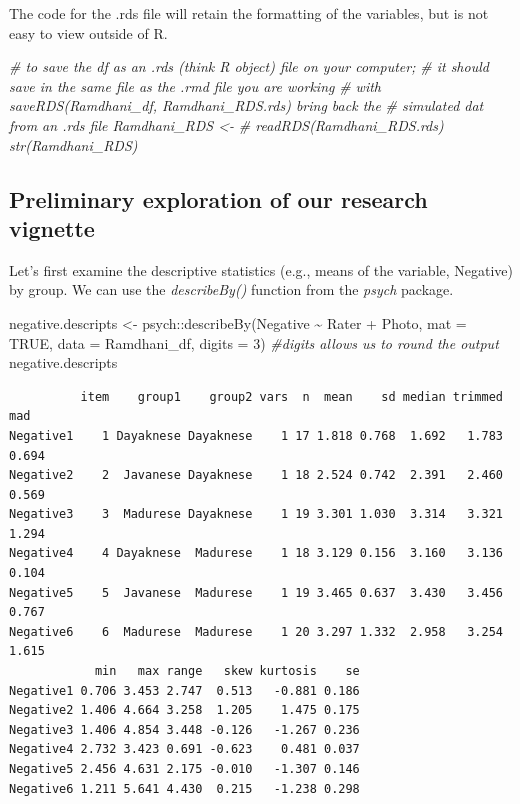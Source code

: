\documentclass[
  11pt,
]{book}
\newenvironment{Shaded}{\begin{snugshade}}{\end{snugshade}}
\newcommand{\AttributeTok}[1]{\textcolor[rgb]{0.77,0.63,0.00}{#1}}
\newcommand{\CommentTok}[1]{\textcolor[rgb]{0.56,0.35,0.01}{\textit{#1}}}
\newcommand{\ConstantTok}[1]{\textcolor[rgb]{0.00,0.00,0.00}{#1}}
\newcommand{\DecValTok}[1]{\textcolor[rgb]{0.00,0.00,0.81}{#1}}
\newcommand{\FunctionTok}[1]{\textcolor[rgb]{0.00,0.00,0.00}{#1}}
\newcommand{\NormalTok}[1]{#1}
\newcommand{\OtherTok}[1]{\textcolor[rgb]{0.56,0.35,0.01}{#1}}
\newcommand{\SpecialCharTok}[1]{\textcolor[rgb]{0.00,0.00,0.00}{#1}}
\begin{document}
The code for the .rds file will retain the formatting of the variables, but is not easy to view outside of R.

\begin{Shaded}
\begin{Highlighting}[]
\CommentTok{\# to save the df as an .rds (think \textquotesingle{}R object\textquotesingle{}) file on your computer;}
\CommentTok{\# it should save in the same file as the .rmd file you are working}
\CommentTok{\# with saveRDS(Ramdhani\_df, \textquotesingle{}Ramdhani\_RDS.rds\textquotesingle{}) bring back the}
\CommentTok{\# simulated dat from an .rds file Ramdhani\_RDS \textless{}{-}}
\CommentTok{\# readRDS(\textquotesingle{}Ramdhani\_RDS.rds\textquotesingle{}) str(Ramdhani\_RDS)}
\end{Highlighting}
\end{Shaded}

\hypertarget{preliminary-exploration-of-our-research-vignette}{%
\subsection{Preliminary exploration of our research vignette}\label{preliminary-exploration-of-our-research-vignette}}

Let's first examine the descriptive statistics (e.g., means of the variable, Negative) by group. We can use the \emph{describeBy()} function from the \emph{psych} package.

\begin{Shaded}
\begin{Highlighting}[]
\NormalTok{negative.descripts }\OtherTok{\textless{}{-}}\NormalTok{ psych}\SpecialCharTok{::}\FunctionTok{describeBy}\NormalTok{(Negative }\SpecialCharTok{\textasciitilde{}}\NormalTok{ Rater }\SpecialCharTok{+}\NormalTok{ Photo, }\AttributeTok{mat =} \ConstantTok{TRUE}\NormalTok{,}
    \AttributeTok{data =}\NormalTok{ Ramdhani\_df, }\AttributeTok{digits =} \DecValTok{3}\NormalTok{)  }\CommentTok{\#digits allows us to round the output}
\NormalTok{negative.descripts}
\end{Highlighting}
\end{Shaded}

\begin{verbatim}
          item    group1    group2 vars  n  mean    sd median trimmed   mad
Negative1    1 Dayaknese Dayaknese    1 17 1.818 0.768  1.692   1.783 0.694
Negative2    2  Javanese Dayaknese    1 18 2.524 0.742  2.391   2.460 0.569
Negative3    3  Madurese Dayaknese    1 19 3.301 1.030  3.314   3.321 1.294
Negative4    4 Dayaknese  Madurese    1 18 3.129 0.156  3.160   3.136 0.104
Negative5    5  Javanese  Madurese    1 19 3.465 0.637  3.430   3.456 0.767
Negative6    6  Madurese  Madurese    1 20 3.297 1.332  2.958   3.254 1.615
            min   max range   skew kurtosis    se
Negative1 0.706 3.453 2.747  0.513   -0.881 0.186
Negative2 1.406 4.664 3.258  1.205    1.475 0.175
Negative3 1.406 4.854 3.448 -0.126   -1.267 0.236
Negative4 2.732 3.423 0.691 -0.623    0.481 0.037
Negative5 2.456 4.631 2.175 -0.010   -1.307 0.146
Negative6 1.211 5.641 4.430  0.215   -1.238 0.298
\end{verbatim}
\end{document}
